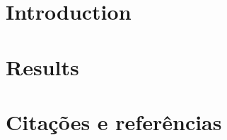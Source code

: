 \documentclass[doutorado, spanish, brazil, english]{packages/icmc}
\begin{document}
\textual

\chapter{Introduction}
\label{chapter:introducao}


%

%

%

%

%

\chapter{Results}
\label{chapter:results}
%




\chapter{Citações e referências}
\label{chapter:citacoes}



% 
\end{document}
